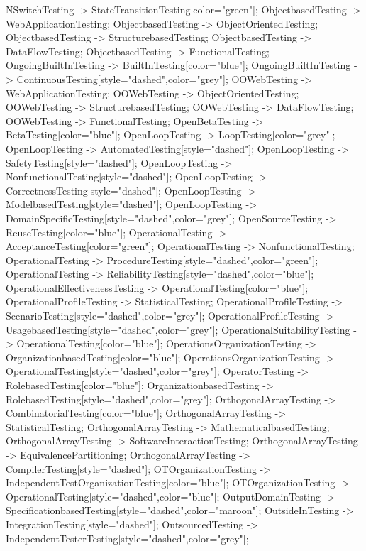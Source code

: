 \documentclass{article}
\begin{document}
{NSwitchTesting -> StateTransitionTesting[color="green"];
ObjectbasedTesting -> WebApplicationTesting;
ObjectbasedTesting -> ObjectOrientedTesting;
ObjectbasedTesting -> StructurebasedTesting;
ObjectbasedTesting -> DataFlowTesting;
ObjectbasedTesting -> FunctionalTesting;
OngoingBuiltInTesting -> BuiltInTesting[color="blue"];
OngoingBuiltInTesting -> ContinuousTesting[style="dashed",color="grey"];
OOWebTesting -> WebApplicationTesting;
OOWebTesting -> ObjectOrientedTesting;
OOWebTesting -> StructurebasedTesting;
OOWebTesting -> DataFlowTesting;
OOWebTesting -> FunctionalTesting;
OpenBetaTesting -> BetaTesting[color="blue"];
OpenLoopTesting -> LoopTesting[color="grey"];
OpenLoopTesting -> AutomatedTesting[style="dashed"];
OpenLoopTesting -> SafetyTesting[style="dashed"];
OpenLoopTesting -> NonfunctionalTesting[style="dashed"];
OpenLoopTesting -> CorrectnessTesting[style="dashed"];
OpenLoopTesting -> ModelbasedTesting[style="dashed"];
OpenLoopTesting -> DomainSpecificTesting[style="dashed",color="grey"];
OpenSourceTesting -> ReuseTesting[color="blue"];
OperationalTesting -> AcceptanceTesting[color="green"];
OperationalTesting -> NonfunctionalTesting;
OperationalTesting -> ProcedureTesting[style="dashed",color="green"];
OperationalTesting -> ReliabilityTesting[style="dashed",color="blue"];
OperationalEffectivenessTesting -> OperationalTesting[color="blue"];
OperationalProfileTesting -> StatisticalTesting;
OperationalProfileTesting -> ScenarioTesting[style="dashed",color="grey"];
OperationalProfileTesting -> UsagebasedTesting[style="dashed",color="grey"];
OperationalSuitabilityTesting -> OperationalTesting[color="blue"];
OperationsOrganizationTesting -> OrganizationbasedTesting[color="blue"];
OperationsOrganizationTesting -> OperationalTesting[style="dashed",color="grey"];
OperatorTesting -> RolebasedTesting[color="blue"];
OrganizationbasedTesting -> RolebasedTesting[style="dashed",color="grey"];
OrthogonalArrayTesting -> CombinatorialTesting[color="blue"];
OrthogonalArrayTesting -> StatisticalTesting;
OrthogonalArrayTesting -> MathematicalbasedTesting;
OrthogonalArrayTesting -> SoftwareInteractionTesting;
OrthogonalArrayTesting -> EquivalencePartitioning;
OrthogonalArrayTesting -> CompilerTesting[style="dashed"];
OTOrganizationTesting -> IndependentTestOrganizationTesting[color="blue"];
OTOrganizationTesting -> OperationalTesting[style="dashed",color="blue"];
OutputDomainTesting -> SpecificationbasedTesting[style="dashed",color="maroon"];
OutsideInTesting -> IntegrationTesting[style="dashed"];
OutsourcedTesting -> IndependentTesterTesting[style="dashed",color="grey"];
}
\end{document}
